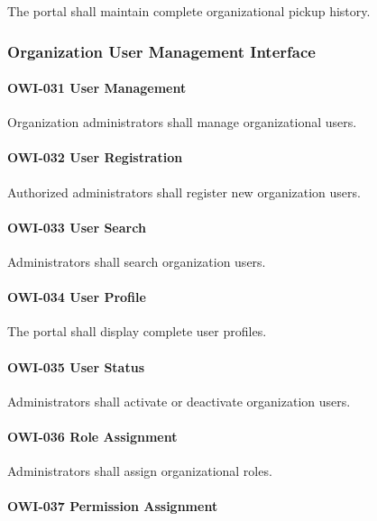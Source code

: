 The portal shall maintain complete organizational pickup history.


\subsubsection*{Organization User Management Interface}

\paragraph{OWI-031 User Management}

Organization administrators shall manage organizational users.

\paragraph{OWI-032 User Registration}

Authorized administrators shall register new organization users.

\paragraph{OWI-033 User Search}

Administrators shall search organization users.

\paragraph{OWI-034 User Profile}

The portal shall display complete user profiles.

\paragraph{OWI-035 User Status}

Administrators shall activate or deactivate organization users.

\paragraph{OWI-036 Role Assignment}

Administrators shall assign organizational roles.

\paragraph{OWI-037 Permission Assignment}

